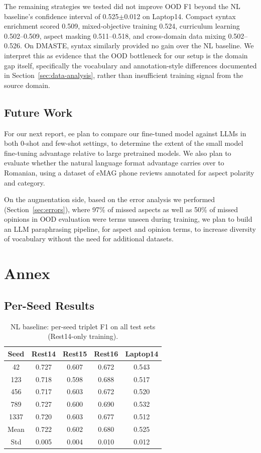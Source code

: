 \documentclass[12pt,a4paper]{report}
\begin{document}
The remaining strategies we tested did not improve OOD F1 beyond the NL baseline's confidence interval of 0.525$\pm$0.012 on Laptop14. Compact syntax enrichment scored 0.509, mixed-objective training 0.524, curriculum learning 0.502--0.509, aspect masking 0.511--0.518, and cross-domain data mixing 0.502--0.526. On DMASTE, syntax similarly provided no gain over the NL baseline. We interpret this as evidence that the OOD bottleneck for our setup is the domain gap itself, specifically the vocabulary and annotation-style differences documented in Section~\ref{sec:data-analysis}, rather than insufficient training signal from the source domain.

\section{Future Work}

For our next report, ee plan to compare our fine-tuned model against LLMs in both 0-shot and few-shot settings, 
to determine the extent of the small model fine-tuning advantage relative to large pretrained models.
 We also plan to evaluate whether the natural language format advantage carries over to Romanian, 
 using a dataset of eMAG phone reviews annotated for aspect polarity and category.

On the augmentation side, based on the error analysis we performed (Section~\ref{sec:errors}), where
97\% of missed aspects as well as 50\% of missed opinions in OOD evaluation were terms 
unseen during training, we plan to build an LLM paraphrasing pipeline, for aspect and opinion terms,
to increase diversity of vocabulary without the need for additional datasets.

\chapter{Annex}\label{ch:annex}

\section{Per-Seed Results}

\begin{table}[H]
\centering
\caption{NL baseline: per-seed triplet F1 on all test sets (Rest14-only training).}
\small
\begin{tabular}{@{}ccccc@{}}
\toprule
\textbf{Seed} & \textbf{Rest14} & \textbf{Rest15} & \textbf{Rest16} & \textbf{Laptop14} \\
\midrule
42 & 0.727 & 0.607 & 0.672 & 0.543 \\
123 & 0.718 & 0.598 & 0.688 & 0.517 \\
456 & 0.717 & 0.603 & 0.672 & 0.520 \\
789 & 0.727 & 0.600 & 0.690 & 0.532 \\
1337 & 0.720 & 0.603 & 0.677 & 0.512 \\
\midrule
Mean & 0.722 & 0.602 & 0.680 & 0.525 \\
Std & 0.005 & 0.004 & 0.010 & 0.012 \\
\bottomrule
\end{tabular}
\end{table}
\end{document}
